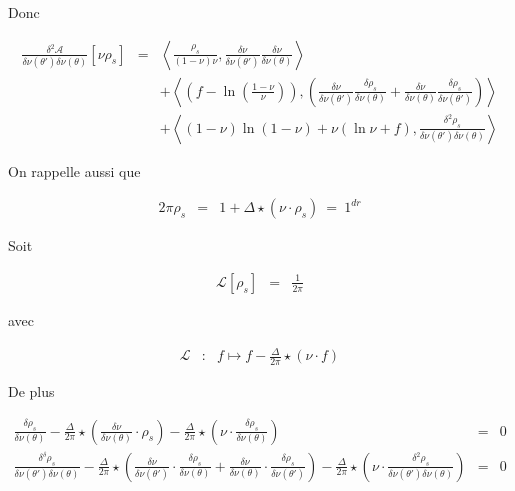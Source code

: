 Donc 
\begin{aff}
\begin{eqnarray*}
	\frac{ \delta^2 \mathcal{A}}{\delta \nu ( \theta')\delta \nu ( \theta)} [ \nu \rho_s ] & = &  \left \langle  \frac{\rho_s}{ (1 - \nu)\nu } , \frac{\delta \nu }{ \delta \nu(\theta' )}\frac{\delta \nu }{ \delta \nu(\theta )}  \right \rangle \\
	& &   +  \left \langle  \left ( f - \ln \left ( \frac{ 1 - \nu }{\nu } \right ) \right ) , \left ( \frac{\delta \nu }{ \delta \nu(\theta' )}\frac{\delta \rho_s }{ \delta \nu(\theta )}  + \frac{\delta \nu }{ \delta \nu(\theta )}\frac{\delta \rho_s }{ \delta \nu(\theta' )}\right )   \right \rangle \\
	& & + \left \langle \left (1 - \nu  \right ) \ln\left (1 - \nu \right ) + \nu \left (  \ln \nu  + f  \right )  , \frac{ \delta^2 \rho_s}{\delta \nu ( \theta' )\delta \nu ( \theta )}  \right \rangle 	
\end{eqnarray*}
\end{aff}



On rappelle aussi que 

\begin{eqnarray*}
	2 \pi \rho_s & = & 1 + \Delta \star ( \nu \cdot \rho_s ) ~= ~ 1^{dr} 	
\end{eqnarray*}

Soit 

\begin{eqnarray*}
	\mathcal{L}[\rho_s] & = & \frac{1}{2\pi} 	
\end{eqnarray*}

avec 

\begin{eqnarray*}
	\mathcal{L}	 & \colon  & f \mapsto  f - \frac{\Delta}{2 \pi }\star ( \nu \cdot f )	
\end{eqnarray*}

De plus

\begin{eqnarray*}
	\frac{\delta \rho_s}{\delta \nu(\theta)} - \frac{\Delta}{2 \pi }  \star \left ( \frac{\delta \nu }{\delta \nu(\theta)}  \cdot \rho_s \right ) - \frac{\Delta}{2 \pi }  \star \left ( \nu \cdot \frac{\delta \rho_s}{\delta \nu(\theta)} \right ) & = & 	0 \\
	\frac{\delta^\delta  \rho_s}{\delta \nu(\theta')\delta \nu(\theta)} - \frac{\Delta}{2 \pi }  \star \left ( \frac{\delta \nu }{\delta \nu(\theta')}  \cdot \frac{\delta \rho_s }{\delta \nu(\theta)} + \frac{\delta \nu }{\delta \nu(\theta)}  \cdot \frac{\delta \rho_s }{\delta \nu(\theta')} \right ) - \frac{\Delta}{2 \pi }  \star \left ( \nu \cdot \frac{\delta^2 \rho_s}{\delta \nu(\theta')\delta \nu(\theta)} \right ) & = & 	0
\end{eqnarray*}

